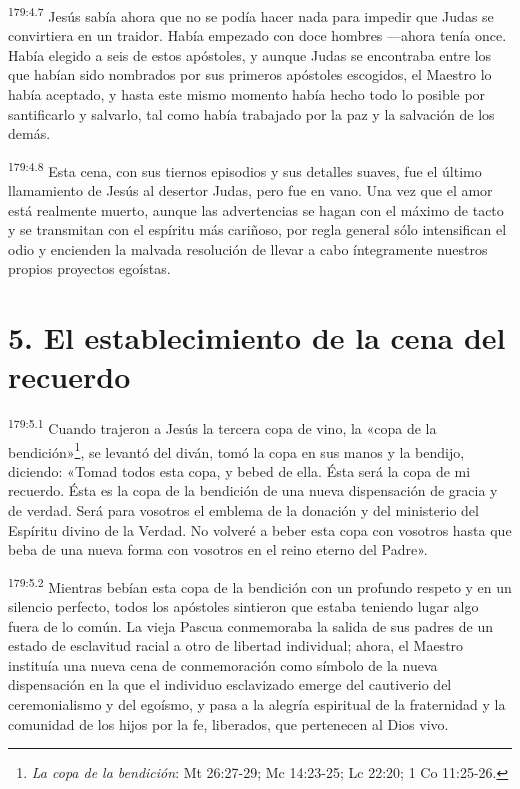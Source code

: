 \par 
\textsuperscript{179:4.7} Jesús sabía ahora que no se podía hacer nada para impedir que Judas se convirtiera en un traidor. Había empezado con doce hombres ---ahora tenía once. Había elegido a seis de estos apóstoles, y aunque Judas se encontraba entre los que habían sido nombrados por sus primeros apóstoles escogidos, el Maestro lo había aceptado, y hasta este mismo momento había hecho todo lo posible por santificarlo y salvarlo, tal como había trabajado por la paz y la salvación de los demás.

\par 
\textsuperscript{179:4.8} Esta cena, con sus tiernos episodios y sus detalles suaves, fue el último llamamiento de Jesús al desertor Judas, pero fue en vano. Una vez que el amor está realmente muerto, aunque las advertencias se hagan con el máximo de tacto y se transmitan con el espíritu más cariñoso, por regla general sólo intensifican el odio y encienden la malvada resolución de llevar a cabo íntegramente nuestros propios proyectos egoístas.

\section*{5. El establecimiento de la cena del recuerdo}
\par 
\textsuperscript{179:5.1} Cuando trajeron a Jesús la tercera copa de vino, la «copa de la bendición»\footnote{\textit{La copa de la bendición}: Mt 26:27-29; Mc 14:23-25; Lc 22:20; 1 Co 11:25-26.}, se levantó del diván, tomó la copa en sus manos y la bendijo, diciendo: «Tomad todos esta copa, y bebed de ella. Ésta será la copa de mi recuerdo. Ésta es la copa de la bendición de una nueva dispensación de gracia y de verdad. Será para vosotros el emblema de la donación y del ministerio del Espíritu divino de la Verdad. No volveré a beber esta copa con vosotros hasta que beba de una nueva forma con vosotros en el reino eterno del Padre».

\par 
\textsuperscript{179:5.2} Mientras bebían esta copa de la bendición con un profundo respeto y en un silencio perfecto, todos los apóstoles sintieron que estaba teniendo lugar algo fuera de lo común. La vieja Pascua conmemoraba la salida de sus padres de un estado de esclavitud racial a otro de libertad individual; ahora, el Maestro instituía una nueva cena de conmemoración como símbolo de la nueva dispensación en la que el individuo esclavizado emerge del cautiverio del ceremonialismo y del egoísmo, y pasa a la alegría espiritual de la fraternidad y la comunidad de los hijos por la fe, liberados, que pertenecen al Dios vivo.

